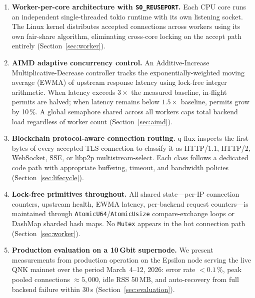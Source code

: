 \documentclass[a4paper, 11pt]{article}
\begin{document}
\begin{enumerate}
  \item \textbf{Worker-per-core architecture with \texttt{SO\_REUSEPORT}.}
        Each CPU core runs an independent single-threaded tokio runtime with its
        own listening socket.  The Linux kernel distributes accepted connections
        across workers using its own fair-share algorithm, eliminating cross-core
        locking on the accept path entirely
        (Section~\ref{sec:worker}).

  \item \textbf{AIMD adaptive concurrency control.}
        An Additive-Increase Multiplicative-Decrease controller tracks the
        exponentially-weighted moving average (EWMA) of upstream response latency
        using lock-free integer arithmetic.  When latency exceeds $3\times$ the
        measured baseline, in-flight permits are halved; when latency remains
        below $1.5\times$ baseline, permits grow by 10\,\%.  A global semaphore
        shared across all workers caps total backend load regardless of worker
        count (Section~\ref{sec:aimd}).

  \item \textbf{Blockchain protocol-aware connection routing.}
        q-flux inspects the first bytes of every accepted TLS connection to
        classify it as HTTP/1.1, HTTP/2, WebSocket, SSE, or libp2p
        multistream-select.  Each class follows a dedicated code path with
        appropriate buffering, timeout, and bandwidth policies
        (Section~\ref{sec:lifecycle}).

  \item \textbf{Lock-free primitives throughout.}
        All shared state---per-IP connection counters, upstream health, EWMA
        latency, per-backend request counters---is maintained through
        \texttt{AtomicU64}/\texttt{AtomicUsize} compare-exchange loops or
        DashMap sharded hash maps.  No \texttt{Mutex} appears in the hot
        connection path (Section~\ref{sec:worker}).

  \item \textbf{Production evaluation on a 10\,Gbit supernode.}
        We present measurements from production operation on the
        Epsilon node serving the live QNK mainnet over the period March~4--12,
        2026: error rate $< 0.1\,\%$,
        peak pooled connections $\approx 5{,}000$, idle RSS 50\,MB, and
        auto-recovery from full backend failure within 30\,s
        (Section~\ref{sec:evaluation}).
\end{enumerate}
\end{document}
